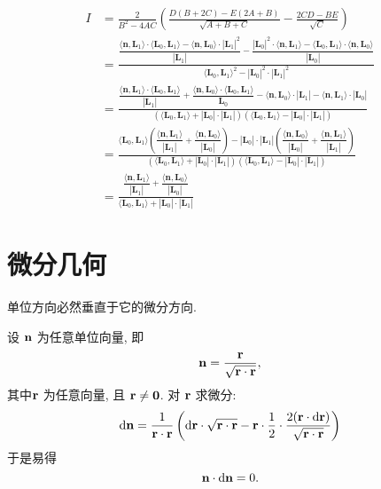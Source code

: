 \begin{align*}
I &= \frac{2}{B^2-4AC}\left(\frac{D(B + 2C) - E(2A+B)}{\sqrt{A+B+C}} - \frac{2CD - BE}{\sqrt{C}}\right)\\
&= \frac{ \dfrac{\langle\mathbf{n},\mathbf{L}_1\rangle\cdot\langle\mathbf{L}_0,\mathbf{L}_1\rangle - \langle\mathbf{n},\mathbf{L}_0\rangle\cdot|\mathbf{L}_1|^2}{|\mathbf{L}_1|} - \dfrac{|\mathbf{L}_0|^2\cdot\langle\mathbf{n},\mathbf{L}_1\rangle - \langle\mathbf{L}_0,\mathbf{L}_1\rangle\cdot\langle\mathbf{n},\mathbf{L}_0\rangle}{|\mathbf{L}_0|} }{\langle\mathbf{L}_0,\mathbf{L}_1\rangle^2-|\mathbf{L}_0|^2\cdot|\mathbf{L}_1|^2}\\
&= \frac{  \dfrac{\langle\mathbf{n},\mathbf{L}_1\rangle\cdot\langle\mathbf{L}_0,\mathbf{L}_1\rangle}{|\mathbf{L}_1|} + \dfrac{\langle\mathbf{n},\mathbf{L}_0\rangle\cdot\langle\mathbf{L}_0,\mathbf{L}_1\rangle}{\mathbf{L}_0} - \langle\mathbf{n},\mathbf{L}_0\rangle\cdot|\mathbf{L}_1| - \langle\mathbf{n},\mathbf{L}_1\rangle\cdot|\mathbf{L}_0|}{(\langle\mathbf{L}_0,\mathbf{L}_1\rangle+|\mathbf{L}_0|\cdot|\mathbf{L}_1|)(\langle\mathbf{L}_0,\mathbf{L}_1\rangle-|\mathbf{L}_0|\cdot|\mathbf{L}_1|)} \\
&= \frac{\langle\mathbf{L}_0,\mathbf{L}_1\rangle\left(\dfrac{\langle\mathbf{n},\mathbf{L}_1\rangle}{|\mathbf{L}_1|}+\dfrac{\langle\mathbf{n},\mathbf{L}_0\rangle}{|\mathbf{L}_0|}\right) - |\mathbf{L}_0|\cdot|\mathbf{L}_1|\left(\dfrac{\langle\mathbf{n},\mathbf{L}_0\rangle}{|\mathbf{L}_0|}+\dfrac{\langle\mathbf{n},\mathbf{L}_1\rangle}{|\mathbf{L}_1|}\right)}{(\langle\mathbf{L}_0,\mathbf{L}_1\rangle+|\mathbf{L}_0|\cdot|\mathbf{L}_1|)(\langle\mathbf{L}_0,\mathbf{L}_1\rangle-|\mathbf{L}_0|\cdot|\mathbf{L}_1|)} \\
&= \frac{\dfrac{\langle\mathbf{n},\mathbf{L}_1\rangle}{|\mathbf{L}_1|}+\dfrac{\langle\mathbf{n},\mathbf{L}_0\rangle}{|\mathbf{L}_0|} }{\langle\mathbf{L}_0,\mathbf{L}_1\rangle + |\mathbf{L}_0|\cdot|\mathbf{L}_1|}
\end{align*}


\newpage
\section{微分几何}
\noindent 单位方向必然垂直于它的微分方向.

设 $\bold{n}$ 为任意单位向量, 即 
$$\bold{n} = \frac{\bold{r}}{\sqrt{\bold{r}\cdot\bold{r}}} ,$$
其中$\bold{r}$ 为任意向量, 且 $\bold{r}\neq\bold{0}$. 对 $\bold{r}$ 求微分:
$$
\mathrm{d}\bold{n} = \frac{1}{\bold{r}\cdot\bold{r}}\left( \mathrm{d}\bold{r}\cdot\sqrt{\bold{r}\cdot\bold{r}} - \bold{r}\cdot\frac{1}{2}\cdot\frac{2(\bold{r}\cdot\mathrm{d}\bold{r})}{\sqrt{\bold{r}\cdot\bold{r}}} \right)
$$
于是易得
$$
\bold{n}\cdot\mathrm{d}\bold{n} = 0.
$$

